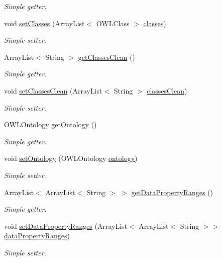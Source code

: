 \begin{DoxyCompactItemize}
\begin{DoxyCompactList}\small\item\em Simple getter. \end{DoxyCompactList}\item 
void \hyperlink{class_ontology_1_1_data_property_a0c2910f2ec8dafd7a9ca203ab3475bf8}{setClasses} (ArrayList$<$ OWLClass $>$ \hyperlink{class_ontology_1_1_data_property_ad6a04d3cfaaaa1b82b085761e298b1d9}{classes})
\begin{DoxyCompactList}\small\item\em Simple setter. \end{DoxyCompactList}\item 
ArrayList$<$ String $>$ \hyperlink{class_ontology_1_1_data_property_a3777a294b72063a555b05c3f4340cfaa}{getClassesClean} ()
\begin{DoxyCompactList}\small\item\em Simple getter. \end{DoxyCompactList}\item 
void \hyperlink{class_ontology_1_1_data_property_a0e06a8d6276cf00012241d15d69fecfc}{setClassesClean} (ArrayList$<$ String $>$ \hyperlink{class_ontology_1_1_data_property_a425c129759217bc744f9c57d0f2d0c0f}{classesClean})
\begin{DoxyCompactList}\small\item\em Simple setter. \end{DoxyCompactList}\item 
OWLOntology \hyperlink{class_ontology_1_1_data_property_a42feee637109118abb6bd0199d6313a7}{getOntology} ()
\begin{DoxyCompactList}\small\item\em Simple getter. \end{DoxyCompactList}\item 
void \hyperlink{class_ontology_1_1_data_property_ad26f093fd1421ede84e7c2a6f3d7ff5a}{setOntology} (OWLOntology \hyperlink{class_ontology_1_1_data_property_aa05bcaca9a48cd30101617e86f4dda41}{ontology})
\begin{DoxyCompactList}\small\item\em Simple setter. \end{DoxyCompactList}\item 
ArrayList$<$ ArrayList$<$ String $>$ $>$ \hyperlink{class_ontology_1_1_data_property_ae681eb33f0135b022bb3ecd3c3a6ca4f}{getDataPropertyRanges} ()
\begin{DoxyCompactList}\small\item\em Simple getter. \end{DoxyCompactList}\item 
void \hyperlink{class_ontology_1_1_data_property_a5d87ce1a23c51a55e500acffbac08c85}{setDataPropertyRanges} (ArrayList$<$ ArrayList$<$ String $>$$>$ \hyperlink{class_ontology_1_1_data_property_a9ffdd8ee11bc8c9a2651e512da2485b7}{dataPropertyRanges})
\begin{DoxyCompactList}\small\item\em Simple setter. \end{DoxyCompactList}\end{DoxyCompactItemize}

